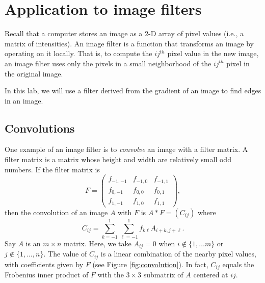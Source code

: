 \section*{Application to image filters}
Recall that a computer stores an image as a 2-D array of pixel values (i.e., a matrix of intensities).
An image filter is a function that transforms an image by operating on it locally.
That is, to compute the $ij^{th}$ pixel value in the new image, an image filter uses only the pixels in a small neighborhood of the $ij^{th}$ pixel in the original image.

In this lab, we will use a filter derived from the gradient of an image to find edges in an image.

\subsection*{Convolutions}
One example of an image filter is to \emph{convolve} an image with a filter matrix.
A filter matrix is a matrix whose height and width are relatively small odd numbers.
If the filter matrix is
\[
F = \begin{pmatrix}
f_{-1,-1}&f_{-1,0}&f_{-1,1}\\
f_{0,-1}&f_{0,0}&f_{0,1}\\
f_{1,-1}&f_{1,0}&f_{1,1}
\end{pmatrix},
\]
then the convolution of an image $A$ with $F$ is $A \ast F = (C_{ij})$ where
\begin{equation}\label{equ:convolve}
C_{ij} = \sum_{k=-1}^1 \sum_{\ell=-1}^1 f_{k\ell}A_{i+k,j+\ell}.
\end{equation}
Say $A$ is an $m \times n$ matrix. Here, we take $A_{ij}=0$ when $i \not \in \{1, \ldots m\}$ or $j \not \in \{1, \ldots, n\}$.
The value of $C_{ij}$ is a linear combination of the nearby pixel values, with coefficients given by $F$ (see Figure \ref{fig:convolution}).
In fact, $C_{ij}$ equals the Frobenius inner product of $F$ with the $3 \times 3$ submatrix of $A$ centered at $ij$.

